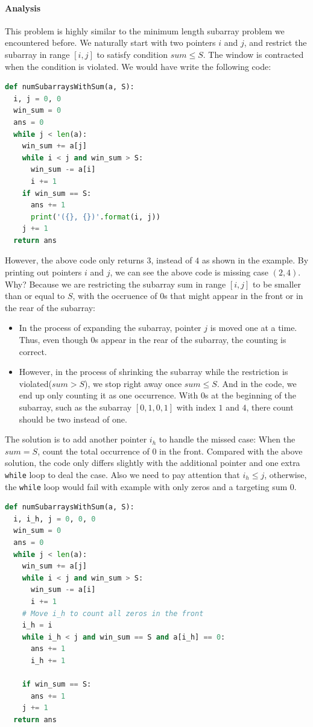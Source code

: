 \documentclass[../main.tex]{subfiles}
\begin{document}
\paragraph{Analysis}
This problem is highly similar to the minimum length subarray problem we encountered before. We naturally start with two pointers $i$ and $j$, and restrict the subarray in range $[i, j]$ to satisfy condition $sum\leq S$. The window is contracted when the condition is violated. We would have write the following code:
\begin{lstlisting}[language=Python]
def numSubarraysWithSum(a, S):
  i, j = 0, 0
  win_sum = 0
  ans = 0
  while j < len(a):
    win_sum += a[j]
    while i < j and win_sum > S:
      win_sum -= a[i]
      i += 1
    if win_sum == S:
      ans += 1
      print('({}, {})'.format(i, j))
    j += 1
  return ans
\end{lstlisting}
However, the above code only returns $3$, instead of $4$ as shown in the example. By printing out pointers $i$ and $j$, we can see the above code is missing case $(2, 4)$. Why? Because we are restricting the subarray sum in range $[i, j]$ to be smaller than or equal to $S$, with the occruence of $0$s that might appear in the front or in the rear of the subarray:
\begin{itemize}
\item In the process of expanding the subarray, pointer $j$ is moved one at a time. Thus, even though $0$s appear in the rear of the subarray, the counting is correct.
\item However, in the process of shrinking the subarray while the restriction is violated($sum > S$), we stop right away once $sum \leq S$. And in the code, we end up only counting it as one occurrence. With $0$s at the beginning of the subarray, such as the subarray $[0, 1, 0, 1]$ with index $1$ and $4$, there count should be two instead of one. 
\end{itemize}
The solution is to add another pointer $i_h$ to handle the missed case: When the $sum=S$, count the total occurrence of $0$ in the front. Compared with the above solution, the code only differs slightly with the additional pointer and one extra \texttt{while} loop to deal the case. Also we need to pay attention that $i_h \leq j$, otherwise, the \texttt{while} loop would fail with example with only zeros and a targeting sum $0$.
\begin{lstlisting}[language=Python]
def numSubarraysWithSum(a, S):
  i, i_h, j = 0, 0, 0
  win_sum = 0
  ans = 0
  while j < len(a):
    win_sum += a[j]
    while i < j and win_sum > S:
      win_sum -= a[i]
      i += 1
    # Move i_h to count all zeros in the front
    i_h = i
    while i_h < j and win_sum == S and a[i_h] == 0:
      ans += 1
      i_h += 1
      
    if win_sum == S:
      ans += 1
    j += 1
  return ans
\end{lstlisting}
\end{document}
